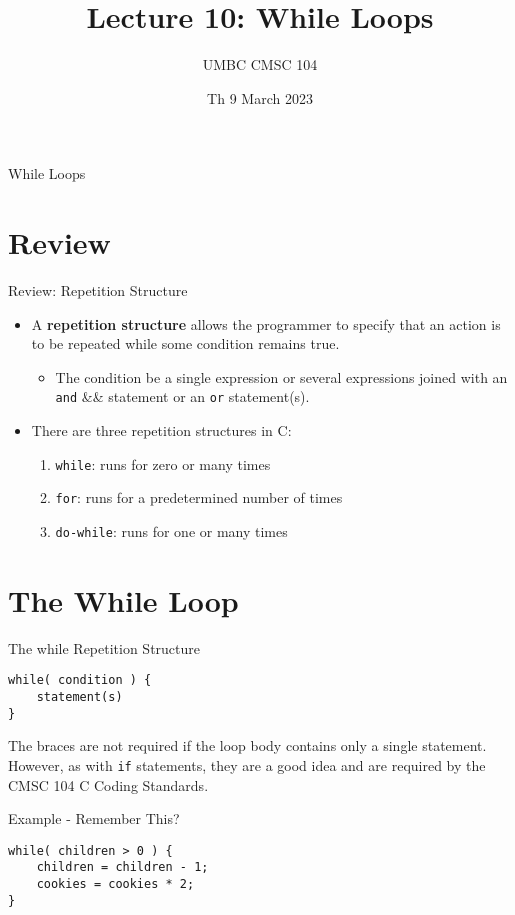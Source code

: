 \documentclass[graphics]{beamer}
\title{Lecture 10: While Loops}
\author{UMBC CMSC 104}
\date{Th 9 March 2023}
\begin{document}
\begin{frame}{}
\centering
    While Loops
\end{frame}

\frame{\tableofcontents}

\section{Review}
\begin{frame}{Review: Repetition Structure}
    \begin{itemize}
        \item A \textbf{repetition structure} allows the programmer to specify that an action is to be repeated while some condition remains true.
        \begin{itemize}
            \item The condition be a single expression or several expressions joined with an \texttt{and} \&\& statement or an \texttt{or} \textbar\textbar statement(s). 
        \end{itemize}
        \item There are three repetition structures in C:
        \begin{enumerate}
            \item \texttt{while}: runs for zero or many times
            \item \texttt{for}: runs for a predetermined number of times
            \item \texttt{do-while}: runs for one or many times
        \end{enumerate}
    \end{itemize}
\end{frame}

\section{The While Loop}
\begin{frame}[fragile]{The while Repetition Structure}
\begin{verbatim}
while( condition ) {
    statement(s)
}
\end{verbatim}
The braces are not required if the loop body contains only a single statement. However, as with \texttt{if} statements, they are a good idea and are required by the CMSC 104 C Coding Standards.
\end{frame}

\begin{frame}[fragile]{Example - Remember This?}
\begin{verbatim}
while( children > 0 ) {
    children = children - 1;
    cookies = cookies * 2;
}
\end{verbatim}
\end{frame}
\end{document}
